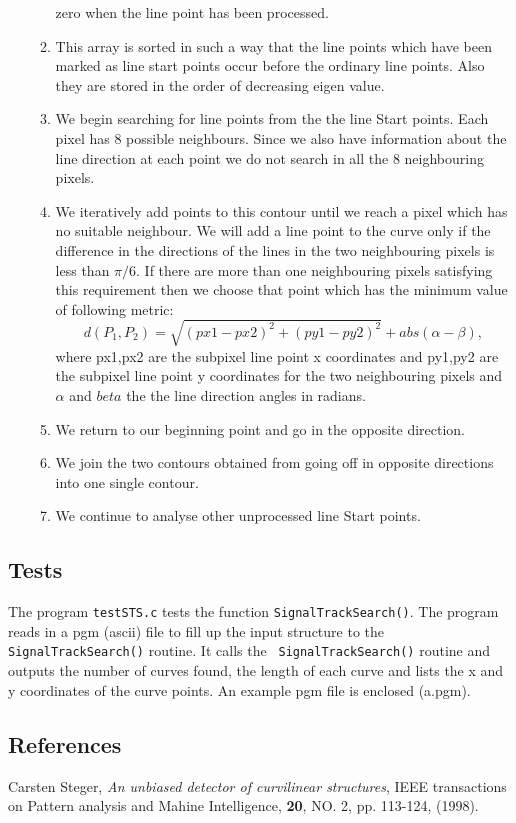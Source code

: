 \begin{itemize}
\begin{enumerate}
zero when the line point has been processed.  
\item This array is sorted in such a way that the line points which
have been marked as line start points occur before the ordinary line
points. Also they are stored in the order of decreasing eigen value. 
\item We begin searching for line points from the the line Start
points. Each pixel has 8 possible neighbours. Since we also have
information about the line direction at each point we do not search in
all the 8 neighbouring pixels. 
\item We iteratively add points to this contour until we reach a
pixel which has no suitable neighbour. We will add a line point to the
curve only if the difference in the directions of the lines in the two
neighbouring pixels is less than $\pi/6$. If there are more than one
neighbouring pixels satisfying this requirement then we choose that
point which has the minimum value of following metric:
$$
d(P_1,P_2) = \sqrt{(px1-px2)^2 + (py1-py2)^2} + abs(\alpha-\beta),
$$
where px1,px2 are the subpixel line point x coordinates and py1,py2
are the subpixel line point y coordinates for the two neighbouring
pixels and $\alpha$ and $beta$ the the line direction angles in radians.

\item We return to our beginning point and go in the opposite
direction. 
\item We join the two contours obtained from going off in opposite
directions into one single contour.
\item We continue to analyse other unprocessed line Start points.
\end{enumerate}
\end{itemize}


\subsection{Tests}

The program {\tt testSTS.c\/} tests the function {\tt SignalTrackSearch()\/}.  
The program reads in a pgm (ascii) file to fill up the input structure
to the {\tt SignalTrackSearch()\/} routine. It calls the {\tt
SignalTrackSearch()\/} routine and outputs the number of curves found,
the length of each curve and lists the x and y coordinates of the
curve points. An example pgm file is enclosed (a.pgm).
  

\subsection{References}

\begin{thebibliography}{0}
 Carsten Steger, {\em An unbiased detector of
curvilinear structures}, IEEE transactions on Pattern analysis and
Mahine Intelligence, {\bf 20}, NO. 2, pp. 113-124, (1998).
\end{thebibliography}



